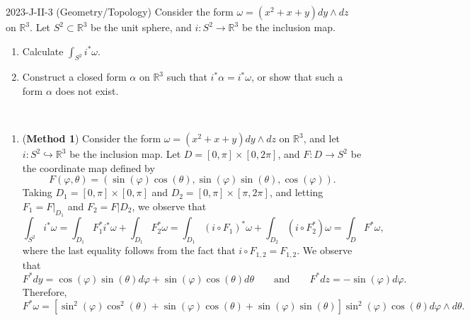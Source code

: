 \documentclass{article}
\begin{document}
\begin{prb}{2023-J-II-3 (Geometry/Topology)}
	Consider the form $\omega = (x^{2} + x + y)dy \wedge dz$ on $\mathbb{R}^{3}$. Let $S^{2} \subset \mathbb{R}^{3}$ be the unit sphere, and $i: S^{2} \to \mathbb{R}^{3}$ be the inclusion map. \vspace{-0.25cm}
		\begin{enumerate}[itemsep =-2pt,label = (\alph{*})]
			\item Calculate $\int_{S^{2}}i^{\ast}\omega$. 
			\item Construct a closed form $\alpha$ on $\mathbb{R}^{3}$ such that $i^{\ast}\alpha = i^{\ast}\omega$, or show that such a form $\alpha$ does not exist. 
		\end{enumerate}
\end{prb}
\begin{solutions}
	$ $\newline \vspace{-0.65cm}
	\begin{enumerate}[itemsep =-2pt,label = (\alph{*})]
		\item (\textbf{Method 1}) Consider the form $\omega = (x^{2} + x + y)dy\wedge dz$ on $\mathbb{R}^{3}$, and let $i: S^{2}\hookrightarrow \mathbb{R}^{3}$ be the inclusion map. Let $D = [0, \pi] \times [0, 2\pi]$, and $F: D \to S^{2}$ be the coordinate map defined by 
			\begin{equation}
				F(\varphi, \theta) = (\sin(\varphi)\cos(\theta), \sin(\varphi)\sin(\theta),\cos(\varphi)). 
			\end{equation}
		Taking $D_{1} = [0, \pi] \times [0, \pi]$ and $D_{2} = [0, \pi]\times [\pi, 2\pi]$, and letting $F_{1} = F|_{D_{1}}$ and $F_{2} = F|D_{2}$, we observe that 
			\begin{equation}
				\int_{S^{2}}i^{\ast}\omega = \int_{D_{1}}F_{1}^{\ast}i^{\ast}\omega + \int_{D_{1}}F_{2}^{\ast}\omega = \int_{D_{1}}(i \circ F_{1})^{\ast}\omega + \int_{D_{2}}(i \circ F_{2}^{\ast})\omega = \int_{D}F^{\ast}\omega, 
			\end{equation}
		where the last equality follows from the fact that $i \circ F_{1,2} = F_{1,2}$. We observe that 
			\begin{equation}
				F^{\ast}dy = \cos(\varphi)\sin(\theta)d\varphi + \sin(\varphi)\cos(\theta)d\theta \qquad \text{and} \qquad F^{\ast}dz = -\sin(\varphi)d\varphi. 
			\end{equation}
		Therefore, 
			\begin{equation}
				F^{\ast}\omega = \left[\sin^{2}(\varphi)\cos^{2}(\theta) + \sin(\varphi)\cos(\theta) + \sin(\varphi)\sin(\theta)\right]\sin^{2}(\varphi)\cos(\theta)d\varphi \wedge d\theta. 

\end{equation}
\end{enumerate}
\end{solutions}
\end{document}

